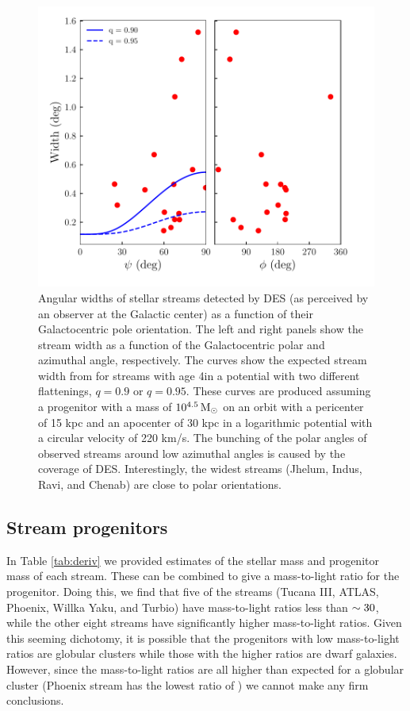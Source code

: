 \documentclass[twocolumn]{aastex61}
\begin{document}
\begin{figure}
\includegraphics[width=\columnwidth]{mw_flattening}
\caption{Angular widths of stellar streams detected by DES (as perceived by an observer at the Galactic center) as a function of their Galactocentric pole orientation.
The left and right panels show the stream width as a function
of the Galactocentric polar and azimuthal angle, respectively. 
The curves show the expected stream width from \citet{Erkal:2016} for streams with age 4\Gyr in a potential with two different flattenings, $q = 0.9$ or $q = 0.95$.
These curves are produced assuming a progenitor with a mass of $10^{4.5}\mathrm{\,M_\odot}$ on an orbit with a pericenter of 15 kpc and an apocenter of 30 kpc in a logarithmic potential with a circular velocity of 220 km/s. 
The bunching of the polar angles of observed streams around low azimuthal angles is caused by the coverage of DES. 
Interestingly, the widest streams (Jhelum, Indus, Ravi, and Chenab) are close to polar orientations.
\label{fig:flattening}
}
\end{figure}

\subsection{Stream progenitors}

In Table \ref{tab:deriv} we provided estimates of the stellar mass and progenitor mass \citep[based on the stream width, see][]{Erkal:2016} of each stream. These can be combined to give a mass-to-light ratio for the progenitor. Doing this, we find that five of the streams (Tucana III, ATLAS, Phoenix, Willka Yaku, and Turbio) have mass-to-light ratios less than $\sim {30}$, while the other eight streams have significantly higher mass-to-light ratios. Given this seeming dichotomy, it is possible that the progenitors with low mass-to-light ratios are globular clusters while those with the higher ratios are dwarf galaxies. However, since the mass-to-light ratios are all higher than expected for a globular cluster (Phoenix stream has the lowest ratio of ) we cannot make any firm 
conclusions. 
\end{document}
